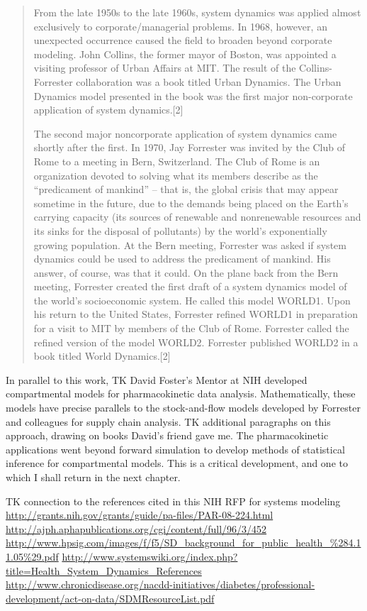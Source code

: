 \begin{quote}
From the late 1950s to the late 1960s, system dynamics was applied
almost exclusively to corporate/managerial problems. In 1968, however,
an unexpected occurrence caused the field to broaden beyond corporate
modeling. John Collins, the former mayor of Boston, was appointed a
visiting professor of Urban Affairs at MIT. The result of the
Collins-Forrester collaboration was a book titled Urban Dynamics. The
Urban Dynamics model presented in the book was the first major
non-corporate application of system dynamics.[2]

The second major noncorporate application of system dynamics came
shortly after the first. In 1970, Jay Forrester was invited by the
Club of Rome to a meeting in Bern, Switzerland. The Club of Rome is an
organization devoted to solving what its members describe as the
``predicament of mankind'' -- that is, the global crisis that may
appear sometime in the future, due to the demands being placed on the
Earth's carrying capacity (its sources of renewable and nonrenewable
resources and its sinks for the disposal of pollutants) by the world's
exponentially growing population. At the Bern meeting, Forrester was
asked if system dynamics could be used to address the predicament of
mankind. His answer, of course, was that it could. On the plane back
from the Bern meeting, Forrester created the first draft of a system
dynamics model of the world's socioeconomic system. He called this
model WORLD1. Upon his return to the United States, Forrester refined
WORLD1 in preparation for a visit to MIT by members of the Club of
Rome. Forrester called the refined version of the model
WORLD2. Forrester published WORLD2 in a book titled World Dynamics.[2]

\end{quote}

In parallel to this work, TK David Foster's Mentor at NIH developed
compartmental models for pharmacokinetic data
analysis. Mathematically, these models have precise parallels to the
stock-and-flow models developed by Forrester and colleagues for supply
chain analysis. TK additional paragraphs on this approach, drawing on
books David's friend gave me. The pharmacokinetic applications went
beyond forward simulation to develop methods of statistical inference
for compartmental models. This is a critical development, and one to
which I shall return in the next chapter.

TK connection to the references cited in this NIH RFP for systems modeling
\url{http://grants.nih.gov/grants/guide/pa-files/PAR-08-224.html}
\url{http://ajph.aphapublications.org/cgi/content/full/96/3/452}
\url{http://www.hpsig.com/images/f/f5/SD_background_for_public_health_%284.11.05%29.pdf}
\url{http://www.systemswiki.org/index.php?title=Health_System_Dynamics_References}
\url{http://www.chronicdisease.org/nacdd-initiatives/diabetes/professional-development/act-on-data/SDMResourceList.pdf}

